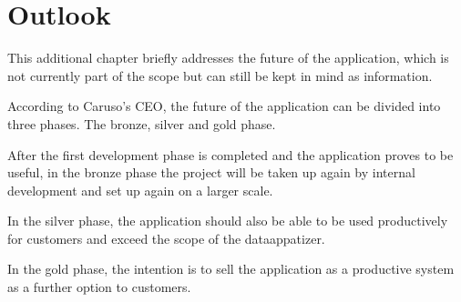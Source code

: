 \chapter{Outlook}
This additional chapter briefly addresses the future of the application, which is not currently part of the scope but can still be kept in mind as information.

According to Caruso's CEO, the future of the application can be divided into three phases. The bronze, silver and gold phase.

After the first development phase is completed and the application proves to be useful, in the bronze phase the project will be taken up again by internal development and set up again on a larger scale.

In the silver phase, the application should also be able to be used productively for customers and exceed the scope of the dataappatizer.

In the gold phase, the intention is to sell the application as a productive system as a further option to customers.